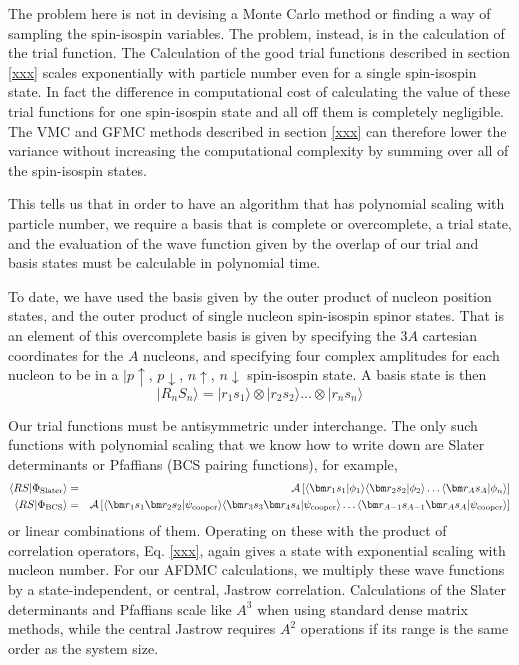 The problem here is not in devising a Monte Carlo method or finding a way
of sampling the spin-isospin variables. The problem, instead, is in the
calculation of the trial function. The Calculation of
the good trial functions described in section \ref{xxx} scales exponentially
with particle number even for a single spin-isospin state. In fact the difference
in computational cost
of calculating the value of these trial functions for one spin-isospin state
and all off them is completely negligible.  The VMC and GFMC methods described
in section \ref{xxx} can therefore lower the variance without increasing the
computational complexity by summing over all of the spin-isospin states.

This tells us that in order to have an algorithm that has polynomial
scaling with particle number, we require a basis that is complete or overcomplete,
a trial state, and the evaluation of the wave function given by the
overlap of our trial and basis states must be calculable in polynomial time.

To date, we have used the basis given by the outer product of nucleon position
states, and the outer product of single nucleon spin-isospin spinor states.
That is an element of this overcomplete basis is given by specifying the
$3A$ cartesian coordinates for the $A$ nucleons, and specifying four complex
amplitudes for each nucleon to be in a $|p\uparrow$, $p\downarrow$, $n\uparrow$,
$n\downarrow$ spin-isospin state. A basis state is then
\begin{equation}
|R_n S_n\rangle =
|r_1 s_1\rangle \otimes |r_2 s_2 \rangle \dots \otimes |r_n s_n\rangle
\end{equation}

Our trial functions must be antisymmetric under interchange. The only such
functions with polynomial scaling that we know how to write down are Slater
determinants or Pfaffians (BCS pairing functions), for example,
\begin{eqnarray}
\langle R S|\Phi_{\rm Slater}\rangle &= &
{\cal A} \left [
\langle \vec r_1 s_1|\phi_1\rangle 
\langle \vec r_2 s_2|\phi_2\rangle 
\dots
\langle \vec r_A s_A|\phi_n\rangle  \right ]
\nonumber\\
\langle R S|\Phi_{\rm BCS}\rangle &=&
{\cal A} \left [ \langle \vec r_1 s_1 \vec r_2 s_2|\psi_{\rm cooper}\rangle
\langle \vec r_3 s_3 \vec r_4 s_4|\psi_{\rm cooper}\rangle
\dots
\langle \vec r_{A-1} s_{A-1} \vec r_A s_A|\psi_{\rm cooper}\rangle
\right ]
\end{eqnarray}
or linear combinations of them. Operating on these with the product of
correlation operators, Eq. \ref{xxx}, again gives a state with
exponential scaling with nucleon number. For our AFDMC calculations, we
multiply these wave functions by a state-independent, or
central, Jastrow correlation. Calculations of the Slater determinants
and Pfaffians scale like $A^3$ when using standard dense matrix methods,
while the central Jastrow requires $A^2$ operations if its range is
the same order as the system size.

